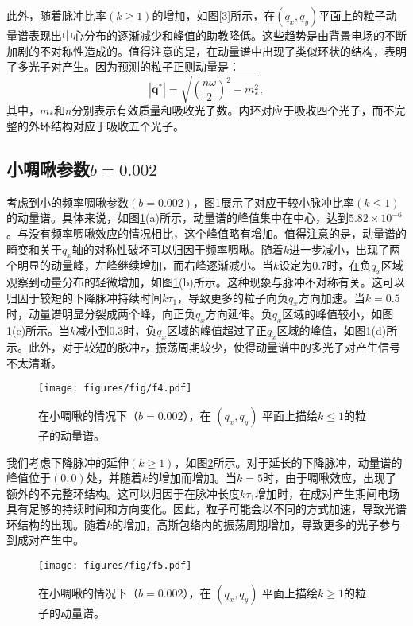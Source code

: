 此外，随着脉冲比率$(k \geq 1)$的增加，如图\ref{3}所示，在$(q_x, q_y)$平面上的粒子动量谱表现出中心分布的逐渐减少和峰值的助教降低。这些趋势是由背景电场的不断加剧的不对称性造成的。值得注意的是，在动量谱中出现了类似环状的结构，表明了多光子对产生。因为预测的粒子正则动量是：
\begin{equation}
\left|\mathbf{q}^{*}\right|=\sqrt{\left(\frac{n \omega}{2}\right)^{2}-m_{*}^{2}},
\end{equation}
其中，$m_*$和$n$分别表示有效质量和吸收光子数\cite{2014ck}。内环对应于吸收四个光子，而不完整的外环结构对应于吸收五个光子。

\subsection{小啁啾参数\texorpdfstring{$b = 0.002$}{b=0.002}}

考虑到小的频率啁啾参数$(b = 0.002)$，图\ref{4}展示了对应于较小脉冲比率$(k \le 1)$的动量谱。具体来说，如图\ref{4}(a)所示，动量谱的峰值集中在中心，达到$5.82 \times 10^{-6}$。与没有频率啁啾效应的情况相比，这个峰值略有增加。值得注意的是，动量谱的畸变和关于$q_x$轴的对称性破坏可以归因于频率啁啾。随着$k$进一步减小，出现了两个明显的动量峰，左峰继续增加，而右峰逐渐减小。当$k$设定为0.7时，在负$q_x$区域观察到动量分布的轻微增加，如图\ref{4}(b)所示。这种现象与脉冲不对称有关。这可以归因于较短的下降脉冲持续时间$k \tau_1$，导致更多的粒子向负$q_x$方向加速。当$k = 0.5$时，动量谱明显分裂成两个峰，向正负$q_x$方向延伸。负$q_x$区域的峰值较小，如图\ref{4}(c)所示。当$k$减小到$0.3$时，负$q_x$区域的峰值超过了正$q_x$区域的峰值，如图\ref{4}(d)所示。此外，对于较短的脉冲$\tau$，振荡周期较少，使得动量谱中的多光子对产生信号不太清晰。

\begin{figure}
  \centering
  \texttt{[image: figures/fig/f4.pdf]}
  \caption{在小啁啾的情况下（$b = 0.002$），在 $(q_x, q_y)$ 平面上描绘$k \le 1$的粒子的动量谱。}
  \label{4}
\end{figure}

我们考虑下降脉冲的延伸$(k\ge 1)$，如图\ref{5}所示。对于延长的下降脉冲，动量谱的峰值位于$(0,0)$处，并随着$k$的增加而增加。当$k = 5$时，由于啁啾效应，出现了额外的不完整环结构。这可以归因于在脉冲长度$k \tau_1$增加时，在成对产生期间电场具有足够的持续时间和方向变化。因此，粒子可能会以不同的方式加速，导致光谱环结构的出现。随着$k$的增加，高斯包络内的振荡周期增加，导致更多的光子参与到成对产生中。

\begin{figure}
  \centering
  \texttt{[image: figures/fig/f5.pdf]}
   \caption{在小啁啾的情况下（$b = 0.002$），在 $(q_x, q_y)$  平面上描绘$k \ge 1$的粒子的动量谱。}
  \label{5}
\end{figure}

